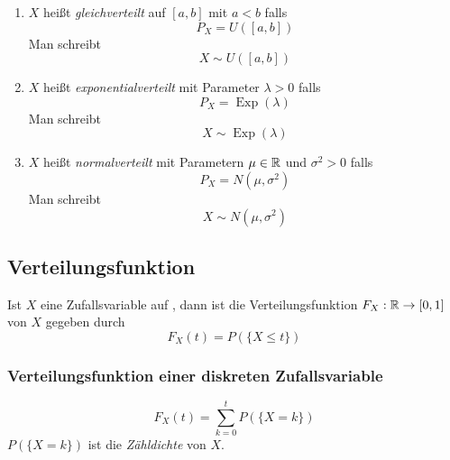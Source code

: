 \begin{enumerate}
    \item $X$ heißt \emph{gleichverteilt} auf $[a,b]$ mit $a<b$ falls
          \begin{equation*}
              P_X=U([a,b])
          \end{equation*}
          Man schreibt
          \begin{equation*}
              X \sim U([a,b])
          \end{equation*}

    \item $X$ heißt \emph{exponentialverteilt} mit Parameter $\lambda > 0$ falls
          \begin{equation*}
              P_X = \operatorname{Exp}(\lambda)
          \end{equation*}
          Man schreibt
          \begin{equation*}
              X \sim \operatorname{Exp}(\lambda)
          \end{equation*}

    \item $X$ heißt \emph{normalverteilt} mit Parametern $\mu \in \mathbb{R}$ und $\sigma^2 >0$
          falls
          \begin{equation*}
              P_X = N(\mu, \sigma^2)
          \end{equation*}
          Man schreibt
          \begin{equation*}
              X \sim N(\mu, \sigma^2)
          \end{equation*}
\end{enumerate}

\subsection{Verteilungsfunktion}
\begin{definition}[Verteilungsfunktion]
    Ist $X$ eine Zufallsvariable auf \wraum, dann ist die Verteilungsfunktion
    $F_X: \mathbb{R} \to [0,1]$ von $X$ gegeben durch
    \begin{equation*}
        F_X(t) = P(\{X \leq t\})
    \end{equation*}
\end{definition}

\subsubsection{Verteilungsfunktion einer diskreten Zufallsvariable}
\begin{equation*}
    F_X(t) = \sum_{k=0}^t P(\{X=k\})
\end{equation*}
$P(\{X=k\})$ ist die \emph{Zähldichte} von $X$.


